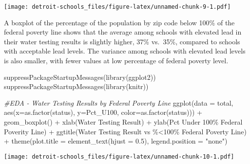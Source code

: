 \documentclass[
]{article}
\newenvironment{Shaded}{\begin{snugshade}}{\end{snugshade}}
\newcommand{\AttributeTok}[1]{\textcolor[rgb]{0.77,0.63,0.00}{#1}}
\newcommand{\CommentTok}[1]{\textcolor[rgb]{0.56,0.35,0.01}{\textit{#1}}}
\newcommand{\FloatTok}[1]{\textcolor[rgb]{0.00,0.00,0.81}{#1}}
\newcommand{\FunctionTok}[1]{\textcolor[rgb]{0.00,0.00,0.00}{#1}}
\newcommand{\NormalTok}[1]{#1}
\newcommand{\SpecialCharTok}[1]{\textcolor[rgb]{0.00,0.00,0.00}{#1}}
\newcommand{\StringTok}[1]{\textcolor[rgb]{0.31,0.60,0.02}{#1}}
\begin{document}
\begin{Shaded}
\end{Shaded}

\texttt{[image: detroit-schools\_files/figure-latex/unnamed-chunk-9-1.pdf]}

A boxplot of the percentage of the population by zip code below 100\% of
the federal poverty line shows that the average among schools with
elevated lead in their water testing results is slightly higher, 37\%
vs.~35\%, compared to schools with acceptable lead levels. The variance
among schools with elevated lead levels is also smaller, with fewer
values at low percentage of federal poverty level.

\begin{Shaded}
\begin{Highlighting}[]
\FunctionTok{suppressPackageStartupMessages}\NormalTok{(}\FunctionTok{library}\NormalTok{(ggplot2))}
\FunctionTok{suppressPackageStartupMessages}\NormalTok{(}\FunctionTok{library}\NormalTok{(knitr))}

\CommentTok{\#EDA {-} Water Testing Results by Federal Poverty Line}
\FunctionTok{ggplot}\NormalTok{(}\AttributeTok{data =}\NormalTok{ total, }\FunctionTok{aes}\NormalTok{(}\AttributeTok{x=}\FunctionTok{as.factor}\NormalTok{(status), }\AttributeTok{y=}\NormalTok{Pct\_U100,}
                        \AttributeTok{color=}\FunctionTok{as.factor}\NormalTok{(status))) }\SpecialCharTok{+}
  \FunctionTok{geom\_boxplot}\NormalTok{() }\SpecialCharTok{+}
  \FunctionTok{xlab}\NormalTok{(}\StringTok{\textquotesingle{}Water Testing Result\textquotesingle{}}\NormalTok{) }\SpecialCharTok{+}
  \FunctionTok{ylab}\NormalTok{(}\StringTok{\textquotesingle{}Pct Under 100\% Federal Poverity Line\textquotesingle{}}\NormalTok{) }\SpecialCharTok{+}
  \FunctionTok{ggtitle}\NormalTok{(}\StringTok{\textquotesingle{}Water Testing Result vs \%\textless{}100\% Federal Poverty Line\textquotesingle{}}\NormalTok{)  }\SpecialCharTok{+} 
  \FunctionTok{theme}\NormalTok{(}\AttributeTok{plot.title =} \FunctionTok{element\_text}\NormalTok{(}\AttributeTok{hjust =} \FloatTok{0.5}\NormalTok{), }\AttributeTok{legend.position =} \StringTok{"none"}\NormalTok{)}
\end{Highlighting}
\end{Shaded}

\texttt{[image: detroit-schools\_files/figure-latex/unnamed-chunk-10-1.pdf]}
\end{document}
